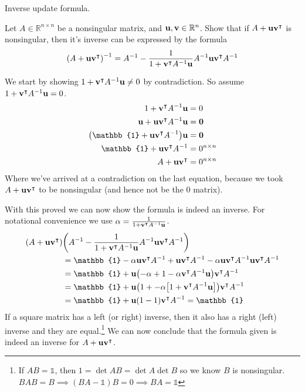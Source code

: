 \documentclass[boxes,pages]{homework}
\newcommand{\tpose}[1]{#1^\intercal}
\newcommand{\inv}[1]{#1^{-1}}
\begin{document}
\begin{problem}
Inverse update formula.

Let $A\in\mathbb{R}^{n\times n}$ be a nonsingular matrix, and $\vb{u}, \vb{v}\in\mathbb{R}^n$. Show that if $A + \vb{u}\tpose{\vb{v}}$ is nonsingular, then it's inverse can be expressed by the formula
\begin{equation*}
	\inv{\qty(A + \vb{u}\tpose{\vb{v}})} = \inv{A} - \frac{1}{1 + \tpose{\vb{v}}\inv{A}\vb{u}}\inv{A}\vb{u}\tpose{\vb{v}}\inv{A}
\end{equation*}
\end{problem}

\begin{solution}
	We start by showing $1 + \tpose{\vb{v}}\inv{A}\vb{u} \neq 0$ by contradiction. So assume $1 + \tpose{\vb{v}}\inv{A}\vb{u} = 0$.
	\begin{align*}
		1 + \tpose{\vb{v}}\inv{A}\vb{u}                      & = 0             \\
		\vb{u} + \vb{u}\tpose{\vb{v}}\inv{A}\vb{u}           & = \vb{0}        \\
		\qty(\mathbb{1} + \vb{u}\tpose{\vb{v}}\inv{A})\vb{u} & = \vb{0}        \\
		\mathbb{1} + \vb{u}\tpose{\vb{v}}\inv{A}             & = 0^{n\times n} \\
		A + \vb{u}\tpose{\vb{v}}                             & = 0^{n\times n}
	\end{align*}
	Where we've arrived at a contradiction on the last equation, because we took $A + \vb{u}\tpose{\vb{v}}$ to be nonsingular (and hence not be the 0 matrix).

	With this proved we can now show the formula is indeed an inverse. For notational convenience we use $\alpha = \frac{1}{1 + \tpose{\vb{v}}\inv{A}\vb{u}}$.
	\begin{align*}
		\qty(A + \vb{u}\tpose{\vb{v}}) & \qty(\inv{A} - \frac{1}{1 + \tpose{\vb{v}}\inv{A}\vb{u}}\inv{A}\vb{u}\tpose{\vb{v}}\inv{A})                                                    \\
		                               & = \mathbb{1} - \alpha\vb{u}\tpose{\vb{v}}\inv{A} + \vb{u}\tpose{\vb{v}}\inv{A} - \alpha \vb{u}\tpose{\vb{v}}\inv{A}\vb{u}\tpose{\vb{v}}\inv{A} \\
		                               & = \mathbb{1} + \vb{u}\qty(-\alpha + 1 - \alpha\tpose{\vb{v}}\inv{A}\vb{u})\tpose{\vb{v}}\inv{A}                                                \\
		                               & = \mathbb{1} + \vb{u}\qty(1 + -\alpha\qty[1 + \tpose{\vb{v}}\inv{A}\vb{u}])\tpose{\vb{v}}\inv{A}                                               \\
		                               & = \mathbb{1} + \vb{u}\qty(1 - 1)\tpose{\vb{v}}\inv{A} = \mathbb{1}
	\end{align*}
	If a square matrix has a left (or right) inverse, then it also has a right (left) inverse and they are equal.\footnote{If $AB = \mathbb{1}$, then $1 = \det AB = \det A\det B$ so we know $B$ is nonsingular. $BAB = B \implies (BA - \mathbb{1})B = 0 \implies BA = \mathbb{1}$} We can now conclude that the formula given is indeed an inverse for $A + \vb{u}\tpose{\vb{v}}$.
\end{solution}
\end{document}
